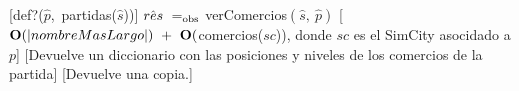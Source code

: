 \begin{Interfaz}
    [def?($\hat{p}$,\ partidas($\hat{s}$))]
    {$\hat{res}\ \igobs\ $verComercios$(\hat{s},\ \hat{p})$}
    [$\bold{O}(|nombreMasLargo|)\ +\ \bold{O}($comercios($sc$)), donde $sc$ es el SimCity asocidado a $p$]
    [Devuelve un diccionario con las posiciones y niveles de los comercios de la partida]
    [Devuelve una copia.]

\end{Interfaz}
